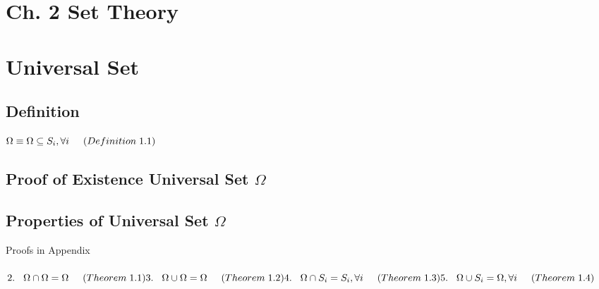 \documentclass[11pt]{article}
\begin{document}
\section*{Ch. 2 Set Theory}

\section{Universal Set}

\subsection{Definition}

\begin{center}
$
\Omega \equiv
\Omega \subseteq  S_i , \forall i \hspace{5mm} (Definition \hspace{1mm}  1.1)
$
\end{center}

\subsection{Proof of Existence Universal Set $\Omega$}

\subsection{Properties of Universal Set $\Omega$}
Proofs in Appendix\\ \\
$
2. \vspace{3mm} \hspace{3mm} \Omega \cap \Omega = \Omega \hspace{5mm}( Theorem \hspace{1mm} 1.1) \\
3. \vspace{3mm} \hspace{3mm} \Omega \cup \Omega = \Omega \hspace{5mm}( Theorem \hspace{1mm}  1.2) \\
4.  \vspace{3mm} \hspace{3mm} \Omega \cap  S_i = S_i, \forall i \hspace{5mm} ( Theorem \hspace{1mm}  1.3) \\
5. \vspace{3mm} \hspace{3mm} \Omega \cup S_i = \Omega, \forall i \hspace{5mm} ( Theorem \hspace{1mm} 1.4)  \\
$
\end{document}
